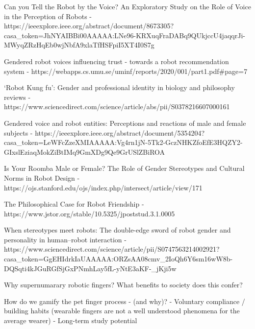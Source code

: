 Can you Tell the Robot by the Voice? An Exploratory Study on the Role of Voice in the Perception of Robots - https://ieeexplore.ieee.org/abstract/document/8673305?casa_token=JhNYAIBBi00AAAAA:LNe96-KRXuqFraDABq9QUkjccU4jaqqrJi-MWyqZRzHqEb0wjNbfA9xlaTfHSFpiI5XT4I0S7g

Gendered robot voices influencing trust -
towards a robot recommendation system
 - https://webapps.cs.umu.se/uminf/reports/2020/001/part1.pdf#page=7


‘Robot Kung fu’: Gender and professional identity in biology and philosophy reviews - https://www.sciencedirect.com/science/article/abs/pii/S0378216607000161


Gendered voice and robot entities: Perceptions and reactions of male and female subjects - https://ieeexplore.ieee.org/abstract/document/5354204?casa_token=LeWFcZzeXMIAAAAA:Vg4rn1jN-5Tk2-GczNHKZfoEfE3HQZY2-GIxslEziaqMokZiBtIMq9GmXDg9Qe9GrUSlZBiROA

Is Your Roomba Male or Female? The Role of Gender Stereotypes and Cultural Norms in Robot Design - https://ojs.stanford.edu/ojs/index.php/intersect/article/view/171

The Philosophical Case for Robot Friendship - https://www.jstor.org/stable/10.5325/jpoststud.3.1.0005

When stereotypes meet robots: The double-edge sword of robot gender and personality in human–robot interaction - https://www.sciencedirect.com/science/article/pii/S0747563214002921?casa_token=GgEHIdrkIaUAAAAA:ORZsAA08cmv_2IoQh6Y6sm16wW8b-DQSqti4kJGuRGfSjGxPNmhLay5fL-yNtE3aKF-_jKji5w










Why supernumarary robotic fingers? What benefits to society does this confer? 























How do we gamify the pet finger process - (and why)? 
- Voluntary compliance / building habits (wearable fingers are not a well understood phenomena for the average wearer)
- Long-term study potential


